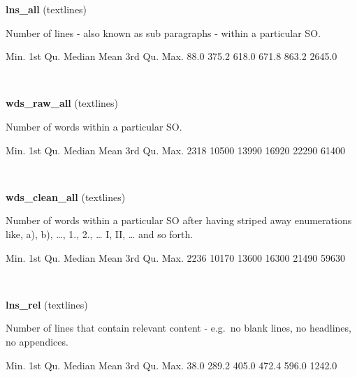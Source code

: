 \documentclass[]{article}
\newenvironment{Shaded}{\begin{snugshade}}{\end{snugshade}}
\newcommand{\DecValTok}[1]{\textcolor[rgb]{0.00,0.00,0.81}{{#1}}}
\newcommand{\FloatTok}[1]{\textcolor[rgb]{0.00,0.00,0.81}{{#1}}}
\newcommand{\NormalTok}[1]{{#1}}
\begin{document}
\textbf{lns\_all} (textlines)

Number of lines - also known as sub paragraphs - within a particular SO.

\begin{Shaded}
\begin{Highlighting}[]
   \NormalTok{Min. 1st Qu.  Median    Mean 3rd Qu.    Max. }
   \FloatTok{88.0}   \FloatTok{375.2}   \FloatTok{618.0}   \FloatTok{671.8}   \FloatTok{863.2}  \FloatTok{2645.0} 
\end{Highlighting}
\end{Shaded}

~

\vspace{1em}

\textbf{wds\_raw\_all} (textlines)

Number of words within a particular SO.

\begin{Shaded}
\begin{Highlighting}[]
   \NormalTok{Min. 1st Qu.  Median    Mean 3rd Qu.    Max. }
   \DecValTok{2318}   \DecValTok{10500}   \DecValTok{13990}   \DecValTok{16920}   \DecValTok{22290}   \DecValTok{61400} 
\end{Highlighting}
\end{Shaded}

~

\vspace{1em}

\textbf{wds\_clean\_all} (textlines)

Number of words within a particular SO after having striped away
enumerations like, a), b), \ldots{}, 1., 2., \ldots{} I, II, \ldots{}
and so forth.

\begin{Shaded}
\begin{Highlighting}[]
   \NormalTok{Min. 1st Qu.  Median    Mean 3rd Qu.    Max. }
   \DecValTok{2236}   \DecValTok{10170}   \DecValTok{13600}   \DecValTok{16300}   \DecValTok{21490}   \DecValTok{59630} 
\end{Highlighting}
\end{Shaded}

~

\vspace{1em}

\textbf{lns\_rel} (textlines)

Number of lines that contain relevant content - e.g.~no blank lines, no
headlines, no appendices.

\begin{Shaded}
\begin{Highlighting}[]
   \NormalTok{Min. 1st Qu.  Median    Mean 3rd Qu.    Max. }
   \FloatTok{38.0}   \FloatTok{289.2}   \FloatTok{405.0}   \FloatTok{472.4}   \FloatTok{596.0}  \FloatTok{1242.0} 
\end{Highlighting}
\end{Shaded}
\end{document}

